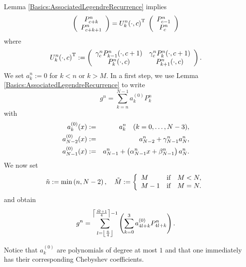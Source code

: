 Lemma \ref{Basics:AssociatedLegendreRecurrence} implies
\begin{equation}
  \label{NFSFT:U}
  \left(\begin{array}{c}
    P_{c+k}^{n} \\ P_{c+k+1}^{n}
  \end{array}\right)
  =
  U_{k}^{n}{\hspace{-0.4ex}}\left(\cdot,c\right)^{\text{\rm{T}}}\;
  \left(\begin{array}{c}
    P_{c-1}^{n} \\ P_{c}^{n}
  \end{array}\right)
\end{equation}
where
$$
  U_{k}^{n}{\hspace{-0.4ex}}\left(\cdot,c\right)^{\text{\rm{T}}} :=
  \left(\begin{array}{cc}
    \gamma_c^{n} P_{k-1}^{n}{\hspace{-0.4ex}}\left(\cdot,c+1\right) & \gamma_c^{n} P_{k}^{n}{\hspace{-0.4ex}}\left(\cdot,c+1\right) \\
                 P_{k}^{n}{\hspace{-0.4ex}}\left(\cdot,c\right)     &              P_{k+1}^{n}{\hspace{-0.4ex}}\left(\cdot,c\right)
  \end{array}\right).   
$$
We set $a_k^n := 0$ for $k < n$ or $k > M$. In a first step, we use Lemma 
\ref{Basics:AssociatedLegendreRecurrence} to write
$$ g^n = \sum_{k = n}^{N-1} a_{k}^{(0)} P_k^{n}$$
with
\begin{eqnarray*}
  a_k^{(0)}{\hspace{-0.4ex}}\left(x\right)     & := & a_k^n \quad (k = 0,\ldots,N-3),\\
  a_{N-2}^{(0)}{\hspace{-0.4ex}}\left(x\right) & := & a_{N-2}^n + \gamma_{N-1}^{n} a_N^n,\\
  a_{N-1}^{(0)}{\hspace{-0.4ex}}\left(x\right) & := & a_{N-1}^n + \left(\alpha_{N-1}^{n}x + \beta_{N-1}^{n}\right) a_N^n.
\end{eqnarray*}
We now set 
$$\tilde{n} := \fun{\min}{n,N-2}, \quad \tilde{M} := \left\{\begin{array}{l@{\quad \text{if} \quad}l} M & M < N, \\ M-1 & M = N.\end{array}\right.$$
and obtain
$$
  g^n = \sum_{l = \left\lfloor\frac{\tilde{n}}{4}\right\rfloor}^{\left\lceil\frac{\tilde{M}+1}{4}\right\rceil-1} \left(\sum_{k=0}^{3} a_{4l+k}^{(0)} P_{4l+k}^{n}\right).
$$

Notice that $a_k^{(0)}$ are polynomials of 
degree at most $1$ and that one immediately has their corresponding Chebyshev coefficients.

